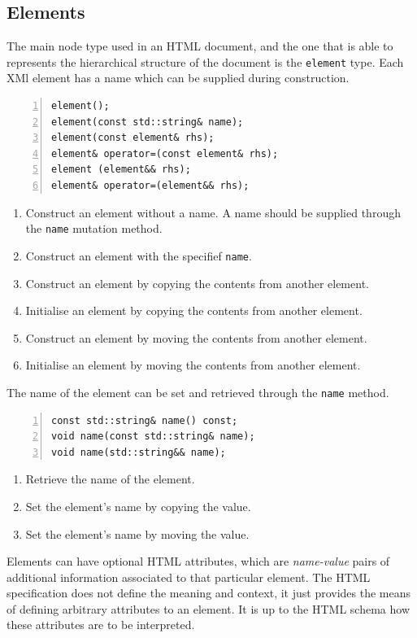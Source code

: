 \documentclass[10pt,a4paper,openany]{mudbook}
\makeatletter
\newcommand{\indextt}[2][]{\texttt{#2}\index{#2@\texttt{#2}#1}}
\newenvironment{enumeratedef}
  {\begin{enumerate}[topsep=0.5em,itemsep=0em,parsep=0em,font=\small]
     \small}
  {\end{enumerate}}
\makeatother
\begin{document}
\subsection{Elements}

The main node type used in an HTML document, and the one that is able to
represents the hierarchical structure of the document is the
\indextt{element} type. Each XMl element has a name which can be supplied
during construction.

\begin{lstlisting}[style=definition,numbers=left]
element();
element(const std::string& name);
element(const element& rhs);
element& operator=(const element& rhs);
element (element&& rhs);
element& operator=(element&& rhs);
\end{lstlisting}
\begin{enumeratedef}
  \item Construct an element without a name. A name should be supplied
        through the \texttt{name} mutation method.
  \item Construct an element with the specifief \texttt{name}.
  \item Construct an element by copying the contents from another element.
  \item Initialise an element by copying the contents from another element.
  \item Construct an element by moving the contents from another element.
  \item Initialise an element by moving the contents from another element.
\end{enumeratedef}

The name of the element can be set and retrieved through the \indextt{name}
method.

\begin{lstlisting}[style=definition,numbers=left]
const std::string& name() const;
void name(const std::string& name);
void name(std::string&& name);
\end{lstlisting}
\begin{enumeratedef}
  \item Retrieve the name of the element.
  \item Set the element's name by copying the value.
  \item Set the element's name by moving the value.
\end{enumeratedef}

Elements can have optional HTML attributes, which are \textit{name-value}
pairs of additional information associated to that particular element. The
HTML specification does not define the meaning and context, it just provides
the means of defining arbitrary attributes to an element. It is up to the
HTML schema how these attributes are to be interpreted.
\end{document}
